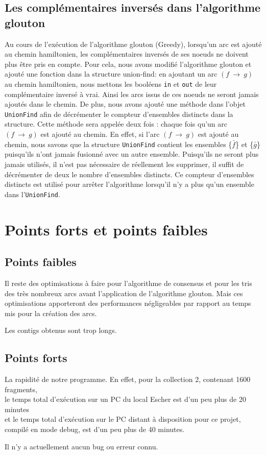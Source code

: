 \documentclass[a4paper, 12pt, titlepage]{article}
\newcommand{\arc}[2]{$(#1~\rightarrow~#2)$}
\begin{document}
\subsection{Les complémentaires inversés dans l'algorithme glouton}%
Au cours de l'exécution de l'algorithme glouton (Greedy), lorsqu'un arc est ajouté au chemin hamiltonien, les complémentaires inversés de ses noeuds ne doivent plus être pris en compte.
Pour cela, nous avons modifié l'algorithme glouton et ajouté une fonction dans la structure union-find:
en ajoutant un arc \arc{f}{g} au chemin hamiltonien, nous mettons les booléens \texttt{in} et \texttt{out} de leur complémentaire inversé à vrai.
Ainsi les arcs issus de ces noeuds ne seront jamais ajoutés dans le chemin.
De plus, nous avons ajouté une méthode dans l'objet \texttt{UnionFind} afin de décrémenter le compteur d'ensembles distincts dans la structure.
Cette méthode sera appelée deux fois : chaque fois qu'un arc \arc{f}{g} est ajouté au chemin.
En effet, si l'arc \arc{f}{g} est ajouté au chemin, nous savons que la structure \texttt{UnionFind} contient les ensembles \{$\bar{f}$\} et \{$\bar{g}$\} puisqu'ils n'ont jamais fusionné avec un autre ensemble.
Puisqu'ils ne seront plus jamais utilisés, il n'est pas nécessaire de
réellement les supprimer, il suffit de décrémenter de deux le nombre d'ensembles distincts.
Ce compteur d'ensembles distincts est utilisé pour arrêter l'algorithme
lorsqu'il n'y a plus qu'un ensemble dans l'\texttt{UnionFind}.





\section{Points forts et points faibles}
\subsection*{Points faibles}
Il reste des optimisations à faire pour l'algorithme de consensus et pour les tris des très nombreux arcs avant l'application de l'algorithme glouton.
Mais ces optimisations apporteront des performances négligeables par rapport au temps mis pour la création des arcs.

Les contigs obtenus sont trop longs.

\subsection*{Points forts}
La rapidité de notre programme. En effet, pour la collection 2, contenant 1600 fragments,\\
le temps total d'exécution sur un PC du local Escher est d'un peu plus de 20 minutes\\
et le temps total d'exécution sur le PC distant à disposition pour ce projet, compilé en mode debug, est d'un peu plus de 40 minutes.

Il n'y a actuellement aucun bug ou erreur connu.
\end{document}
